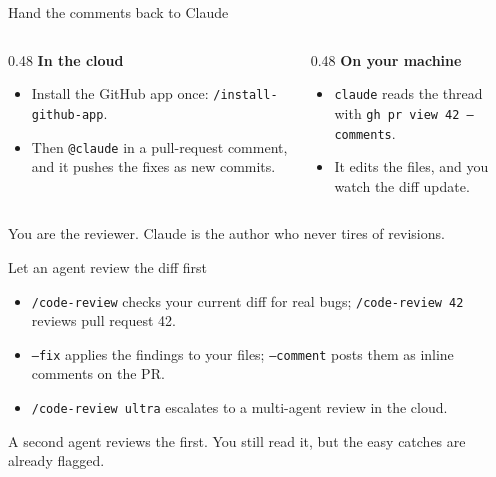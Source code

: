 \documentclass[aspectratio=169,11pt]{beamer}
\begin{document}
\begin{frame}{Hand the comments back to Claude}
\begin{columns}[T]
\begin{column}{0.48\textwidth}
\textbf{In the cloud}
\begin{itemize}\setlength\itemsep{0.25em}
    \item Install the GitHub app once: \texttt{/install-github-app}.
    \item Then \texttt{@claude} in a pull-request comment, and it pushes the fixes as new commits.
\end{itemize}
\end{column}
\begin{column}{0.48\textwidth}
\textbf{On your machine}
\begin{itemize}\setlength\itemsep{0.25em}
    \item \texttt{claude} reads the thread with \texttt{gh pr view 42 --comments}.
    \item It edits the files, and you watch the diff update.
\end{itemize}
\end{column}
\end{columns}
\vspace{0.4cm}
\alert{You are the reviewer. Claude is the author who never tires of revisions.}
\end{frame}

\begin{frame}{Let an agent review the diff first}
\begin{itemize}\setlength\itemsep{0.3em}
    \item \texttt{/code-review} checks your current diff for real bugs; \texttt{/code-review 42} reviews pull request 42.
    \item \texttt{--fix} applies the findings to your files; \texttt{--comment} posts them as inline comments on the PR.
    \item \texttt{/code-review ultra} escalates to a multi-agent review in the cloud.
\end{itemize}
\vspace{0.4cm}
\alert{A second agent reviews the first. You still read it, but the easy catches are already flagged.}
\end{frame}
\end{document}
